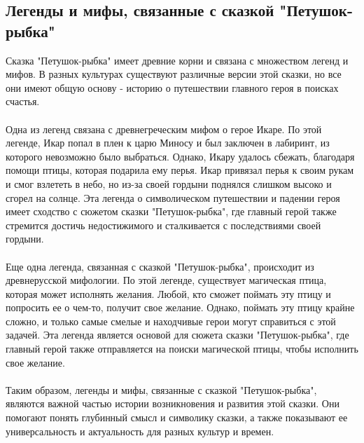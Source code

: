 \documentclass{article}
\begin{document}
\subsection{Легенды и мифы, связанные с сказкой "{}{}Петушок-рыбка"{}{}}
Сказка "{}{}Петушок-рыбка"{}{} имеет древние корни и связана с множеством легенд и мифов. В разных культурах существуют различные версии этой сказки, но все они имеют общую основу - историю о путешествии главного героя в поисках счастья.\\
~\\
Одна из легенд связана с древнегреческим мифом о герое Икаре. По этой легенде, Икар попал в плен к царю Миносу и был заключен в лабиринт, из которого невозможно было выбраться. Однако, Икару удалось сбежать, благодаря помощи птицы, которая подарила ему перья. Икар привязал перья к своим рукам и смог взлететь в небо, но из-за своей гордыни поднялся слишком высоко и сгорел на солнце. Эта легенда о символическом путешествии и падении героя имеет сходство с сюжетом сказки "{}{}Петушок-рыбка"{}{}, где главный герой также стремится достичь недостижимого и сталкивается с последствиями своей гордыни.\\
~\\
Еще одна легенда, связанная с сказкой "{}{}Петушок-рыбка"{}{}, происходит из древнерусской мифологии. По этой легенде, существует магическая птица, которая может исполнять желания. Любой, кто сможет поймать эту птицу и попросить ее о чем-то, получит свое желание. Однако, поймать эту птицу крайне сложно, и только самые смелые и находчивые герои могут справиться с этой задачей. Эта легенда является основой для сюжета сказки "{}{}Петушок-рыбка"{}{}, где главный герой также отправляется на поиски магической птицы, чтобы исполнить свое желание.\\
~\\
Таким образом, легенды и мифы, связанные с сказкой "{}{}Петушок-рыбка"{}{}, являются важной частью истории возникновения и развития этой сказки. Они помогают понять глубинный смысл и символику сказки, а также показывают ее универсальность и актуальность для разных культур и времен.
\end{document}
